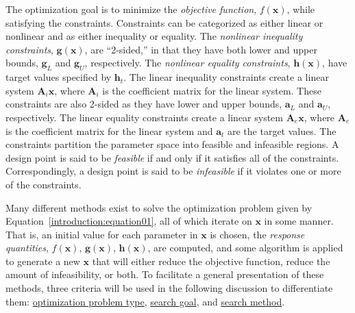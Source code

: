 The optimization goal is to minimize the \emph{objective function},
$f(\mathbf{x})$, while satisfying the constraints.  Constraints can be
categorized as either linear or nonlinear and as either inequality or
equality. The \emph{nonlinear inequality constraints},
$\mathbf{g(x)}$, are ``2-sided,'' in that they have both lower and
upper bounds, $\mathbf{g}_L$ and $\mathbf{g}_U$, respectively. The
\emph{nonlinear equality constraints}, $\mathbf{h(x)}$, have target
values specified by $\mathbf{h}_{t}$.  The linear inequality
constraints create a linear system $\mathbf{A}_i\mathbf{x}$, where
$\mathbf{A}_i$ is the coefficient matrix for the linear system.  These
constraints are also 2-sided as they have lower and upper bounds,
$\mathbf{a}_L$ and $\mathbf{a}_U$, respectively. The linear equality
constraints create a linear system $\mathbf{A}_e\mathbf{x}$, where
$\mathbf{A}_e$ is the coefficient matrix for the linear system and
$\mathbf{a}_{t}$ are the target values.  The constraints partition the
parameter space into feasible and infeasible regions. A design point
is said to be \emph{feasible} if and only if it satisfies all of the
constraints. Correspondingly, a design point is said to be
\emph{infeasible} if it violates one or more of the constraints.

Many different methods exist to solve the optimization problem given
by Equation~\ref{introduction:equation01}, all of which iterate on
$\mathbf{x}$ in some manner.  That is, an initial value for each
parameter in $\mathbf{x}$ is chosen, the \emph{response quantities},
$f(\mathbf{x})$, $\mathbf{g(x)}$, $\mathbf{h(x)}$, are computed, and
some algorithm is applied to generate a new $\mathbf{x}$ that will
either reduce the objective function, reduce the amount of
infeasibility, or both.  To facilitate a general presentation of these
methods, three criteria will be used in the following discussion to
differentiate them: \underline{optimization problem type},
\underline{search goal}, and \underline{search method}.

